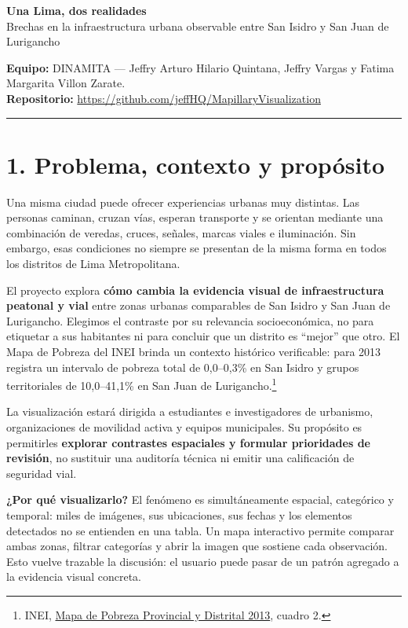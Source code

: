 \documentclass[10pt]{article}
\begin{document}
{\color{navy}\LARGE\textbf{Una Lima, dos realidades}}\\[-2pt]
{\large Brechas en la infraestructura urbana observable entre San Isidro y San Juan de Lurigancho}

\vspace{4pt}
\small
\textbf{Equipo:} DINAMITA --- Jeffry Arturo Hilario Quintana, Jeffry Vargas y Fatima Margarita Villon Zarate.\\
\textbf{Repositorio:} \url{https://github.com/jeffHQ/MapillaryVisualization}

\hrule\vspace{7pt}

\section*{1. Problema, contexto y propósito}

Una misma ciudad puede ofrecer experiencias urbanas muy distintas. Las personas caminan, cruzan vías, esperan transporte y se orientan mediante una combinación de veredas, cruces, señales, marcas viales e iluminación. Sin embargo, esas condiciones no siempre se presentan de la misma forma en todos los distritos de Lima Metropolitana.

El proyecto explora \textbf{cómo cambia la evidencia visual de infraestructura peatonal y vial} entre zonas urbanas comparables de San Isidro y San Juan de Lurigancho. Elegimos el contraste por su relevancia socioeconómica, no para etiquetar a sus habitantes ni para concluir que un distrito es ``mejor'' que otro. El Mapa de Pobreza del INEI brinda un contexto histórico verificable: para 2013 registra un intervalo de pobreza total de 0,0--0,3\% en San Isidro y grupos territoriales de 10,0--41,1\% en San Juan de Lurigancho.\footnote{INEI, \href{https://www.inei.gob.pe/media/DocumentosPublicos/pobreza/2013/Mapa-de-pobreza-provincial-y-distrital-2013.pdf}{Mapa de Pobreza Provincial y Distrital 2013}, cuadro 2.}

La visualización estará dirigida a estudiantes e investigadores de urbanismo, organizaciones de movilidad activa y equipos municipales. Su propósito es permitirles \textbf{explorar contrastes espaciales y formular prioridades de revisión}, no sustituir una auditoría técnica ni emitir una calificación de seguridad vial.

\textbf{¿Por qué visualizarlo?} El fenómeno es simultáneamente espacial, categórico y temporal: miles de imágenes, sus ubicaciones, sus fechas y los elementos detectados no se entienden en una tabla. Un mapa interactivo permite comparar ambas zonas, filtrar categorías y abrir la imagen que sostiene cada observación. Esto vuelve trazable la discusión: el usuario puede pasar de un patrón agregado a la evidencia visual concreta.
\end{document}
